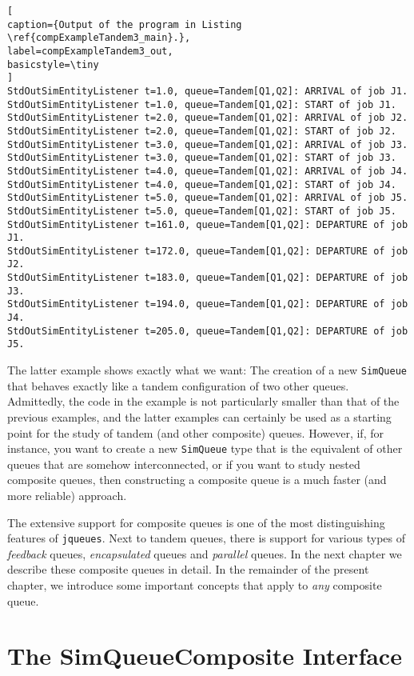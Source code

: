 \begin{lstlisting}[
caption={Output of the program in Listing \ref{compExampleTandem3_main}.},
label=compExampleTandem3_out,
basicstyle=\tiny
]
StdOutSimEntityListener t=1.0, queue=Tandem[Q1,Q2]: ARRIVAL of job J1.
StdOutSimEntityListener t=1.0, queue=Tandem[Q1,Q2]: START of job J1.
StdOutSimEntityListener t=2.0, queue=Tandem[Q1,Q2]: ARRIVAL of job J2.
StdOutSimEntityListener t=2.0, queue=Tandem[Q1,Q2]: START of job J2.
StdOutSimEntityListener t=3.0, queue=Tandem[Q1,Q2]: ARRIVAL of job J3.
StdOutSimEntityListener t=3.0, queue=Tandem[Q1,Q2]: START of job J3.
StdOutSimEntityListener t=4.0, queue=Tandem[Q1,Q2]: ARRIVAL of job J4.
StdOutSimEntityListener t=4.0, queue=Tandem[Q1,Q2]: START of job J4.
StdOutSimEntityListener t=5.0, queue=Tandem[Q1,Q2]: ARRIVAL of job J5.
StdOutSimEntityListener t=5.0, queue=Tandem[Q1,Q2]: START of job J5.
StdOutSimEntityListener t=161.0, queue=Tandem[Q1,Q2]: DEPARTURE of job J1.
StdOutSimEntityListener t=172.0, queue=Tandem[Q1,Q2]: DEPARTURE of job J2.
StdOutSimEntityListener t=183.0, queue=Tandem[Q1,Q2]: DEPARTURE of job J3.
StdOutSimEntityListener t=194.0, queue=Tandem[Q1,Q2]: DEPARTURE of job J4.
StdOutSimEntityListener t=205.0, queue=Tandem[Q1,Q2]: DEPARTURE of job J5.
\end{lstlisting}

The latter example shows exactly what we want:
  The creation of a new \lstinline|SimQueue|
  that behaves exactly like a tandem configuration of two other queues.
Admittedly, the code in the example is not particularly smaller
  than that of the previous examples,
  and the latter examples can certainly be used as a starting point
  for the study of tandem (and other composite) queues.
However, if, for instance, you want to create a new \lstinline|SimQueue| type
  that is the equivalent of other queues that are somehow interconnected,
  or if you want to study nested composite queues,
  then constructing a composite queue is a much faster
  (and more reliable) approach.

The extensive support for composite queues
  is one of the most distinguishing features of \lstinline|jqueues|.
Next to tandem queues, there is support for various types of
  {\em feedback\/} queues, {\em encapsulated\/} queues
  and {\em parallel\/} queues.
In the next chapter we describe these composite queues in detail.
In the remainder of the present chapter,
  we introduce some important concepts that
  apply to {\em any\/} composite queue.

\section{The SimQueueComposite Interface}
\label{sec:simqueuecomposite}

